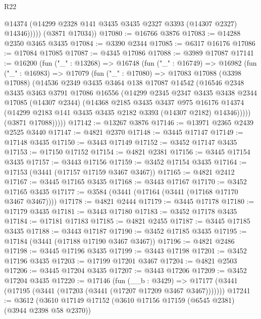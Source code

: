 \begin{lexlean}{R22}
\begin{coremodule}
              @14374
              (@14299 @2328 @141 @3435 @3435 @2327 @3393 (@14307 @2327) @14346)))))
      (@3871 @17034))
@17080 := @16766 @3876
@17083 := @14288 @2350 @3465 @3435
@17084 := @3390 @2344
@17085 := @6317 @16176
@17086 := @17084 @17085
@17087 := @4345 @17086
@17088 := @3989 @17087
@17141 := @16200
    (fun ("_" : @13268) =>
    @16748
      (fun ("_" : @16749) =>
      @16982
        (fun ("_" : @16983) =>
        @17079
          (fun ("_" : @17080) =>
          @17083
            @17088
            (@3398 @17088)
            (@14536
              @2349
              @3435
              @3464
              @138
              @17087
              @14542
              (@16546
                @2348
                @3435
                @3463
                @3791
                @17086
                @16556
                (@14299
                  @2345
                  @2347
                  @3435
                  @3438
                  @2344
                  @17085
                  (@14307 @2344)
                  (@14368
                    @2185
                    @3435
                    @3437
                    @975
                    @16176
                    @14374
                    (@14299 @2183 @141 @3435 @3435 @2182 @3393 (@14307 @2182) @14346)))))
            (@3871 @17088)))))
@17142 := @13267 @3876
@17146 := @13971 @2365 @2439 @2525 @3440
@17147 := @4821 @2370
@17148 := @3445 @17147
@17149 := @17148 @3435
@17150 := @3443 @17149
@17152 := @3452 @17147 @3435
@17153 := @17150 @17152
@17154 := @4821 @2381
@17156 := @3445 @17154 @3435
@17157 := @3443 @17156
@17159 := @3452 @17154 @3435
@17164 := @17153 (@3441 (@17157 @17159 @3467 @3467))
@17165 := @4821 @2412
@17167 := @3445 @17165 @3435
@17168 := @3443 @17167
@17170 := @3452 @17165 @3435
@17177 := @3584 (@3441 (@17164 (@3441 (@17168 @17170 @3467 @3467))))
@17178 := @4821 @2444
@17179 := @3445 @17178
@17180 := @17179 @3435
@17181 := @3443 @17180
@17183 := @3452 @17178 @3435
@17184 := @17181 @17183
@17185 := @4821 @2455
@17187 := @3445 @17185 @3435
@17188 := @3443 @17187
@17190 := @3452 @17185 @3435
@17195 := @17184 (@3441 (@17188 @17190 @3467 @3467))
@17196 := @4821 @2486
@17198 := @3445 @17196 @3435
@17199 := @3443 @17198
@17201 := @3452 @17196 @3435
@17203 := @17199 @17201 @3467
@17204 := @4821 @2503
@17206 := @3445 @17204 @3435
@17207 := @3443 @17206
@17209 := @3452 @17204 @3435
@17220 := @17146
    (fun (__b : @3429) =>
    @17177 (@3441 (@17195 (@3441 (@17203 (@3441 (@17207 @17209 @3467 @3467)))))))
@17241 := @3612
    (@3610
      @17149
      @17152
      (@3610 @17156 @17159 (@6545 @2381) (@3944 @2398 @58 @2370))

\end{coremodule}
\end{lexlean}
